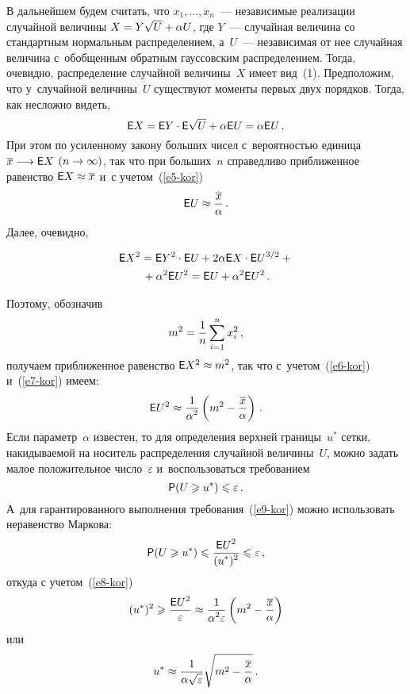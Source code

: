 \begin{multicols}{2}
В дальнейшем будем считать, что $x_1,\ldots,x_n$~--- независимые
реализации случайной величины $X\hm=Y\sqrt{U}+\alpha U$, где $Y$~---
случайная величина со стандартным нормальным распределением, а~$U$~---
независимая от нее случайная величина с~обобщенным обратным
гауссовским распределением. Тогда, очевидно, распределение случайной
величины~$X$ имеет вид~(1). Предположим, что у~случайной величины~$U$
существуют моменты первых двух порядков. Тогда, как несложно видеть,
\begin{equation}
{\sf E}X={\sf E}Y\cdot{\sf E}\sqrt{U}+\alpha{\sf E}U=\alpha{\sf
E}U\,.\label{e5-kor}
\end{equation}
При этом по усиленному закону больших чисел с~вероятностью единица
$\overline x\hm\longrightarrow {\sf E}X$ $(n\hm\to\infty)$, так что при
больших~$n$ справедливо приближенное равенство ${\sf E}X\hm\approx\overline x$
и~с учетом~(\ref{e5-kor})
\begin{equation}
{\sf E}U\approx\displaystyle\frac{\displaystyle \overline x\mathstrut}{\displaystyle \alpha\mathstrut}\,.\label{e6-kor}
\end{equation}
Далее, очевидно,

\columnbreak

\noindent
\begin{multline}
{\sf E}X^2={\sf E}Y^2\cdot{\sf E}U+2\alpha{\sf E}X\cdot{\sf E}U^{3/2}+{}\\
{}+
\alpha^2{\sf E}U^2={\sf E}U+\alpha^2{\sf E}U^2\,.
\label{e7-kor}
\end{multline}

\noindent
Поэтому, обозначив
$$
m^2=\displaystyle\frac{\displaystyle 1\mathstrut}{\displaystyle n\mathstrut}\sum\limits_{i=1}^nx_i^2\,,
$$
получаем приближенное равенство ${\sf E}X^2\hm\approx m^2$, так что
с~учетом~(\ref{e6-kor}) и~(\ref{e7-kor}) имеем:
\begin{equation}
{\sf E}U^2\approx\displaystyle\frac{\displaystyle 1\mathstrut}{\displaystyle \alpha^2\mathstrut}\left(m^2-\displaystyle\frac{\displaystyle \overline
x\mathstrut}{\displaystyle \alpha\mathstrut}\right)\,.\label{e8-kor}
\end{equation}
Если параметр~$\alpha$ известен, то для определения верхней границы~$u^*$
сетки, накидываемой на носитель распределения случайной
величины~$U$, можно задать малое положительное число~$\varepsilon$
и~воспользоваться требованием
\begin{equation}
{\sf P}(U\geqslant u^*)\leqslant\varepsilon\,.\label{e9-kor}
\end{equation}
А~для гарантированного выполнения требования~(\ref{e9-kor}) можно использовать
неравенство Маркова:
$$
{\sf P}(U\geqslant u^*)\leqslant\displaystyle\frac{\displaystyle {\sf E}U^2\mathstrut}{\displaystyle (u^*)^2\mathstrut}\leqslant \varepsilon\,,
$$
откуда с учетом~(\ref{e8-kor})
$$
(u^*)^2\geqslant\displaystyle\frac{\displaystyle {\sf E}U^2\mathstrut}{\displaystyle \varepsilon\mathstrut}\approx
\displaystyle\frac{\displaystyle 1\mathstrut}{\displaystyle \alpha^2\varepsilon\mathstrut}\left( m^2-\displaystyle\frac{\displaystyle \overline x\mathstrut}{\displaystyle \alpha\mathstrut}\right)
$$
или
\begin{equation}
u^*\approx\displaystyle\frac{\displaystyle 1\mathstrut}{\displaystyle \alpha\sqrt{\varepsilon}\mathstrut}\sqrt{m^2-
\displaystyle\frac{\displaystyle \overline x\mathstrut}{\displaystyle \alpha\mathstrut}}\,.\label{e10-kor}
\end{equation}


\end{multicols}

